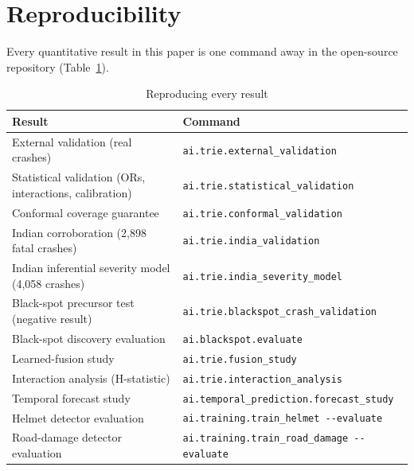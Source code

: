 \documentclass[journal]{IEEEtran}
\begin{document}
\appendix
\section{Reproducibility}

Every quantitative result in this paper is one command away in the open-source repository (Table~\ref{tab:repro}).

\begin{table}[h]
\centering
\caption{Reproducing every result}
\label{tab:repro}
\small
\begin{tabular}{p{4.3cm}p{3.7cm}}
\toprule
\textbf{Result} & \textbf{Command} \\
\midrule
External validation (real crashes) & \texttt{ai.\allowbreak trie.\allowbreak external\_validation} \\
Statistical validation (ORs, interactions, calibration) & \texttt{ai.\allowbreak trie.\allowbreak statistical\_validation} \\
Conformal coverage guarantee & \texttt{ai.\allowbreak trie.\allowbreak conformal\_validation} \\
Indian corroboration (2,898 fatal crashes) & \texttt{ai.\allowbreak trie.\allowbreak india\_validation} \\
Indian inferential severity model (4,058 crashes) & \texttt{ai.\allowbreak trie.\allowbreak india\_severity\_model} \\
Black-spot precursor test (negative result) & \texttt{ai.\allowbreak trie.\allowbreak blackspot\_crash\_validation} \\
Black-spot discovery evaluation & \texttt{ai.\allowbreak blackspot.\allowbreak evaluate} \\
Learned-fusion study & \texttt{ai.\allowbreak trie.\allowbreak fusion\_study} \\
Interaction analysis (H-statistic) & \texttt{ai.\allowbreak trie.\allowbreak interaction\_analysis} \\
Temporal forecast study & \texttt{ai.\allowbreak temporal\_prediction.\allowbreak forecast\_study} \\
Helmet detector evaluation & \texttt{ai.\allowbreak training.\allowbreak train\_helmet \mbox{-{}-evaluate}} \\
Road-damage detector evaluation & \texttt{ai.\allowbreak training.\allowbreak train\_road\_damage \mbox{-{}-evaluate}} \\
\bottomrule
\end{tabular}
\end{table}
\end{document}
